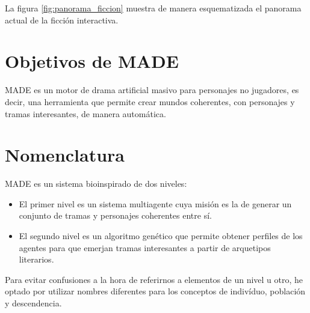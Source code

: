 

La figura \ref{fig:panorama_ficcion} muestra de manera esquematizada el panorama actual de la ficción interactiva.





\section{Objetivos de MADE}
\label{objetivos}

MADE es un motor de drama artificial masivo para personajes no jugadores, es decir, una herramienta que permite crear mundos coherentes, con personajes y tramas interesantes, de manera automática.



\section{Nomenclatura}

MADE es un sistema bioinspirado de dos niveles:

\begin{itemize}
\item El primer nivel es un sistema multiagente cuya misión es la de generar un conjunto de tramas y personajes coherentes entre sí.
\item El segundo nivel es un algoritmo genético que permite obtener perfiles de los agentes para que emerjan tramas interesantes a partir de arquetipos literarios. 
\end{itemize}

Para evitar confusiones a la hora de referirnos a elementos de un nivel u otro, he optado por utilizar nombres diferentes para los conceptos de indivíduo, población y descendencia.\\

